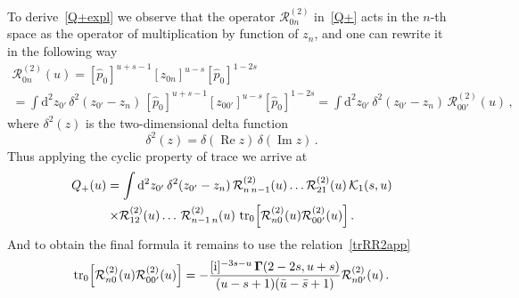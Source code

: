 \documentclass[a4paper,11pt]{article}
\renewcommand{\imath}{\mathrm{i}}
\renewcommand{\Re}{\operatorname{Re}}
\renewcommand{\Im}{\operatorname{Im}}
\newcommand{\tr}{\mathop{\rm tr}\nolimits}
\numberwithin{equation}{section}
\begin{document}
To derive~\eqref{Q+expl} we observe that the operator $\mathcal{R}^{(2)}_{0n}$ in~\eqref{Q+} acts in the $n$-th space as the operator of multiplication by function of $z_n$, and one can rewrite it in the following way
\begin{multline} \nonumber
	\mathcal{R}^{(2)}_{0n}(u) = [\hat{p}_0]^{u+s-1}[z_{0n}]^{u-s}[\hat{p}_0]^{1-2s} \\
	= \int \mathrm{d}^2z_{0'} \, \delta^2(z_{0'}-z_n) \,
	[\hat{p}_0]^{u+s-1}[z_{00'}]^{u-s}[\hat{p}_0]^{1-2s}
	= \int \mathrm{d}^2z_{0'} \, \delta^2(z_{0'}-z_n) \, \mathcal{R}^{(2)}_{00'}(u) \,,
\end{multline}
where $\delta^2(z)$ is the two-dimensional delta function
\begin{equation} \label{delta2D}
	\delta^2(z) = \delta(\Re z) \, \delta(\Im z) \,.
\end{equation}
Thus applying the cyclic property of trace we arrive at
\begin{multline} \nonumber
		Q_+(u) =
		\int \mathrm{d}^2z_{0'} \, \delta^2(z_{0'}-z_n) \,
		\mathcal{R}^{(2)}_{n\,n-1}(u)\ldots\mathcal{R}^{(2)}_{21}(u)\,\mathcal{K}_1(s,u) \\
		\times
		\mathcal{R}^{(2)}_{12}(u)\ldots\,\mathcal{R}^{(2)}_{n-1\,n}(u) \,
		\tr_{0}\Bigl[\mathcal{R}^{(2)}_{n0}(u)\mathcal{R}^{(2)}_{00'}(u)\Bigr]\,.
\end{multline}
And to obtain the final formula it remains to use the relation~\eqref{trRR2app}
\begin{equation} \nonumber
	\tr_{0}\Bigl[\mathcal{R}^{(2)}_{n0}(u)\mathcal{R}^{(2)}_{00'}(u)\Bigr]
	= -\frac{[\imath]^{-3s-u}\,\mathbf{\Gamma}(2-2s,u+s)}{(u-s+1)(\bar{u}-\bar{s}+1)}
	\mathcal{R}^{(2)}_{n0'}(u) \,.
\end{equation}
\end{document}
